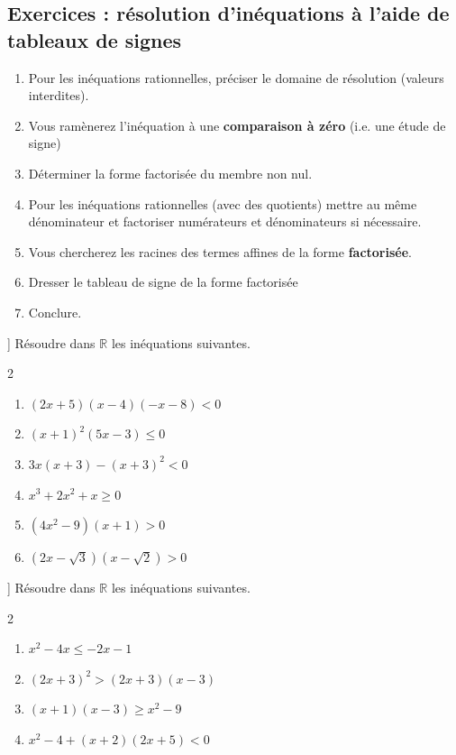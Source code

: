 \documentclass[main.tex]{subfiles}
\begin{document}
\subsection{Exercices : résolution d'inéquations à l'aide de tableaux de signes}
\begin{tBox}[frametitle={Point méthode}] 
 	\begin{enumerate} 
	\item Pour les inéquations rationnelles, préciser le domaine de résolution (valeurs interdites).
	\item  Vous ramènerez l'inéquation à une \textbf{comparaison à zéro} (i.e. une étude de signe)
	\item Déterminer la forme factorisée du membre non nul.
	\item Pour les inéquations rationnelles (avec des quotients) mettre au même dénominateur et factoriser numérateurs et dénominateurs si nécessaire.
	\item Vous chercherez les racines des termes affines de la forme \textbf{factorisée}. 
	\item Dresser le tableau de signe de la forme factorisée 
	\item  Conclure.
\end{enumerate}
\end{tBox}
\begin{exercise}\label{chapter15:exercice:inequation01}] Résoudre dans $\mathbb{R}$ les inéquations suivantes.\vspace{-1em} 
	\begin{multicols}{2}
		\begin{enumerate}[label={$(I_{\arabic*})$\rule{0pt}{1.6em} : },leftmargin=*]
			\item $(2x+5)(x-4)(-x-8)<0$
			\item $(x+1)^2(5x-3)\leqslant 0$
			\item $3x(x+3)-(x+3)^2 < 0$
			\item $ x^3+2x^2+x\geqslant 0$ 
			\item $(4x^ 2-9)(x+1)>0$
			\item $(2x-\sqrt{3})(x-\sqrt{2})>0$
		\end{enumerate}
	\end{multicols} 
\end{exercise}

\begin{exercise}\label{chapter15:exercice:inequation02}] Résoudre dans $\mathbb{R}$ les inéquations suivantes.\vspace{-1em} 
	\begin{multicols}{2}
		\begin{enumerate}[label={$(I_{\arabic*})$\rule{0pt}{1.6em} : },leftmargin=*]
			\item $x^2-4x\leqslant -2x-1$
			\item $(2x+3)^ 2>(2x+3)(x-3)$
			\item $(x+1)(x-3)\geqslant x^2-9$
			\item $ x^2-4+(x+2)(2x+5)<0$
		\end{enumerate}
	\end{multicols} 
\end{exercise}
\end{document}
